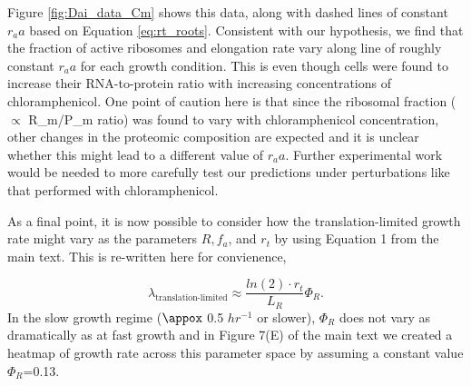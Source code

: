 Figure \ref{fig:Dai_data_Cm} shows this data, along with dashed lines of
constant $r_aa$ based on Equation \ref{eq:rt_roots}. Consistent with our
hypothesis, we find that the fraction of active ribosomes and elongation rate
vary along line of roughly constant $r_aa$ for each growth condition. This is
even though cells were found to increase their RNA-to-protein ratio with
increasing concentrations of chloramphenicol. One point of caution here is that
since the ribosomal fraction ($\propto$ R_m/P_m ratio) was found to vary with
chloramphenicol concentration, other changes in the proteomic composition are
expected and it is unclear whether this might lead to a different value of
$r_aa$. Further experimental work would be needed to more carefully test our
predictions under perturbations like that performed with chloramphenicol.

As a final point, it is now possible to consider how the translation-limited
growth rate  might vary as the parameters $R, f_a$, and $r_t$ by using Equation
1 from the main text. This is re-written here for convienence,

\begin{equation}
\lambda_{\textrm{translation-limited}} \approx \frac{ln(2) \cdot r_t}{L_R}  \Phi_R.
\end{equation}
In the slow growth regime ($\appox$ 0.5 $hr^{-1}$ or slower), $\Phi_R$ does not
vary as dramatically as at fast growth and  in Figure 7(E) of the main text we
created a heatmap of growth rate across this parameter space by assuming a
constant value $\Phi_R$=0.13.
